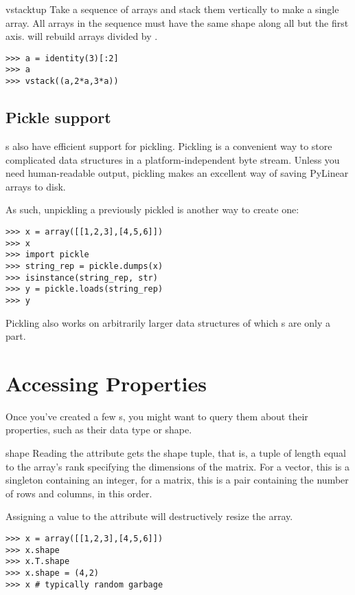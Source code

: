 \begin{funcdesc}{vstack}{tup}
  Take a sequence of arrays and stack them vertically to make a single array.
  All arrays in the sequence must have the same shape along all but the first
  axis.  will rebuild arrays divided by .
  
\begin{verbatim}
>>> a = identity(3)[:2]
>>> a
>>> vstack((a,2*a,3*a))
\end{verbatim}
\end{funcdesc}
\subsection{Pickle support}

s also have efficient support for pickling. Pickling is a
convenient way to store complicated data structures in a platform-independent
byte stream. Unless you need human-readable output, pickling makes an
excellent way of saving PyLinear arrays to disk. 

As such, unpickling a previously pickled  is another way to create one:

\begin{verbatim}
>>> x = array([[1,2,3],[4,5,6]])
>>> x
>>> import pickle
>>> string_rep = pickle.dumps(x)
>>> isinstance(string_rep, str)
>>> y = pickle.loads(string_rep)
>>> y
\end{verbatim}

Pickling also works on arbitrarily larger data structures of which
s are only a part.
\section{Accessing  Properties}

\label{sec:arrayproperties}
Once you've created a few s, you might want to query them
about their properties, such as their data type or shape.

\begin{memberdesc}[Array]{shape}
  Reading the  attribute gets the shape tuple, that is,
  a tuple of length equal to the array's rank specifying the
  dimensions of the matrix.  For a vector, this is a singleton
  containing an integer, for a matrix, this is a pair containing the
  number of rows and columns, in this order.  

  Assigning a value to the  attribute will destructively
  resize the array.

\begin{verbatim}
>>> x = array([[1,2,3],[4,5,6]])
>>> x.shape
>>> x.T.shape
>>> x.shape = (4,2)
>>> x # typically random garbage
\end{verbatim}
\end{memberdesc}

